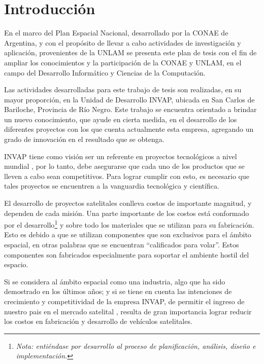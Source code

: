 \chapter{Introducción}\label{chap:intro}
En el marco del Plan Espacial Nacional, desarrollado por la \ac{CONAE} de Argentina, y con el propósito de llevar a cabo actividades de investigación y 
aplicación, provenientes de la \ac{UNLAM} se presenta este plan de tesis con el fin de ampliar los 
conocimientos y la participación de la \ac{CONAE} y \ac{UNLAM}, en el campo del Desarrollo Informático y 
Ciencias de la Computación.

Las actividades desarrolladas para este trabajo de tesis son realizadas, en su mayor proporción, en 
la Unidad de Desarrollo \ac{INVAP}, ubicada en San Carlos de Bariloche, Provincia de Río Negro. Este 
trabajo se encuentra orientado a brindar un nuevo conocimiento, que ayude en cierta medida, en el 
desarrollo de los diferentes proyectos con los que cuenta actualmente esta empresa, agregando un 
grado de innovación en el resultado que se obtenga.

\ac{INVAP} tiene como visión ser un referente en proyectos tecnológicos a nivel mundial \citep{invapWEB}, 
por lo tanto, debe asegurarse que cada uno de los productos que se lleven a cabo sean competitivos. 
Para lograr cumplir con esto, es necesario que tales proyectos se encuentren a la vanguardia 
tecnológica y científica.  

El desarrollo de proyectos satelitales conlleva costos de importante magnitud, y 
dependen de cada misión. Una parte importante de los costos está conformado por el 
desarrollo\footnote{\textit{Nota: entiéndase por desarrollo al proceso de planificación, análisis, 
diseño e implementación.}} y sobre todo los materiales que se utilizan para su fabricación. Esto 
es debido a que se utilizan componentes que son exclusivos para el ámbito espacial, en otras 
palabras que se encuentran ``calificados para volar''. Estos componentes son fabricados especialmente para soportar el ambiente hostil del espacio.

Si se considera al ámbito espacial como una industria, algo que ha sido demostrado en los últimos 
años; y si se tiene en cuenta las intenciones de crecimiento y competitividad de la empresa INVAP,  de permitir el ingreso de nuestro pais en el mercado satelital \cite{invapWEB}, resulta de gran 
importancia lograr reducir los costos en fabricación y desarrollo de vehículos satelitales.

